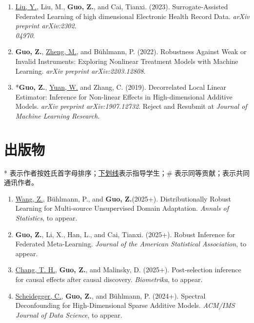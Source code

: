 \documentclass[margin, line]{res}
\begin{document}
\begin{resume}
\begin{enumerate}
			\item \underline{Liu, Y.}, Liu, M., {\bf Guo, Z.}, and Cai, Tianxi. (2023).
				Surrogate-Assisted Federated Learning of high dimensional Electronic
				Health Record Data. {\it arXiv preprint arXiv:2302.\\04970}.

			\item {\bf Guo, Z.}, \underline{Zheng, M.}, and B\"{u}hlmann, P. (2022).
				Robustness Against Weak or Invalid Instruments: Exploring Nonlinear Treatment
				Models with Machine Learning. {\it arXiv preprint arXiv:2203.12808}.

			\item {*}{\bf Guo, Z.}, \underline{Yuan, W.} and Zhang, C. (2019). Decorrelated
				Local Linear Estimator: Inference for Non-linear Effects in High-dimensional
				Additive Models. {\it arXiv preprint arXiv:1907.12732}.
				{Reject and Resubmit} at {\it Journal of Machine Learning Research}.
		\end{enumerate}
		\section{\sc 出版物}
		* 表示作者按姓氏首字母排序；\underline{下划线}表示指导学生；$\#$ 表示同等贡献；\Envelope 表示共同通讯作者。
		\vspace{2mm}
		\begin{enumerate}
			\setcounter{enumi}{0}
			\setlength{\itemsep}{3pt}

			\item \underline{Wang, Z.}, Bühlmann, P., and {\bf Guo, Z.}(2025+). Distributionally
				Robust Learning for Multi-source Unsupervised Domain Adaptation.
				{\it Annals of Statistics}, to appear.

			\item {\bf Guo, Z.}, Li, X., Han, L., and Cai, Tianxi. (2025+). Robust
				Inference for Federated Meta-Learning. {\it Journal of the American Statistical Association},
				to appear.

			\item \underline{Chang, T. H.}, {\bf Guo, Z.}, and Malinsky, D. (2025+).
				Post-selection inference for causal effects after causal discovery. {\it Biometrika},
				to appear.

			\item \underline{Scheidegger, C.}, {\bf Guo, Z.}, and B\"{u}hlmann, P. (2024+).
				Spectral Deconfounding for High-Dimensional Sparse Additive Models.
				{\it ACM/IMS Journal of Data Science}, to appear.


\end{enumerate}
\end{resume}
\end{document}
